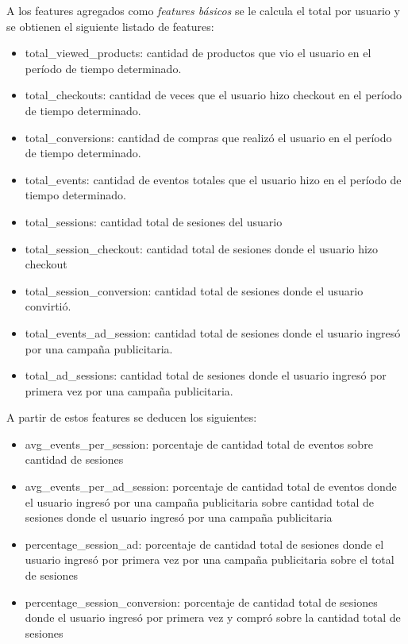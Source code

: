 \documentclass[a4paper]{article}
\begin{document}
A los features agregados como \textit{features básicos} se le calcula el total por usuario y se obtienen el siguiente listado de features:
\begin{itemize}
	\item total\_viewed\_products: cantidad de productos que vio el usuario en el período de tiempo determinado.
	\item total\_checkouts: cantidad de veces que el usuario hizo checkout en el período de tiempo determinado.
	\item total\_conversions: cantidad de compras que realizó el usuario en el período de tiempo determinado.
	\item total\_events: cantidad de eventos totales que el usuario hizo en el período de tiempo determinado.
	\item total\_sessions: cantidad total de sesiones del usuario
	\item total\_session\_checkout: cantidad total de sesiones donde el usuario hizo checkout
	\item total\_session\_conversion: cantidad total de sesiones donde el usuario convirtió.
	\item total\_events\_ad\_session: cantidad total de sesiones donde el usuario ingresó por una campaña publicitaria.
	\item total\_ad\_sessions: cantidad total de sesiones donde el usuario ingresó por primera vez por una campaña publicitaria.
\end{itemize}
	
A partir de estos features se deducen los siguientes:

\begin{itemize}
	\item avg\_events\_per\_session: porcentaje de cantidad total de eventos sobre cantidad de sesiones
	\item avg\_events\_per\_ad\_session: porcentaje de cantidad total de eventos donde el usuario ingresó por una campaña publicitaria sobre cantidad total de sesiones donde el usuario ingresó por una campaña publicitaria
	\item percentage\_session\_ad: porcentaje de cantidad total de sesiones donde el usuario ingresó por primera vez por una campaña publicitaria sobre el total de sesiones
	\item percentage\_session\_conversion: porcentaje de cantidad total de sesiones donde el usuario ingresó por primera vez y compró sobre la cantidad total de sesiones
\end{itemize}
\end{document}
